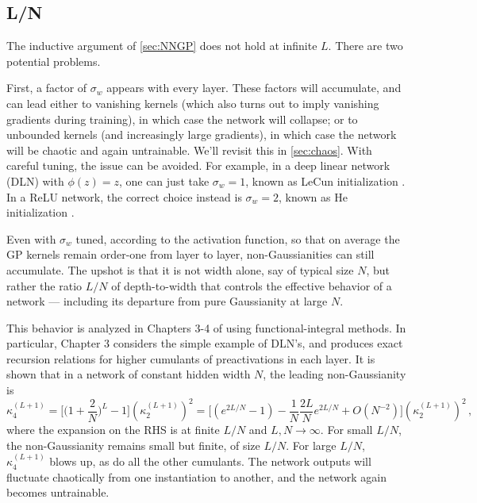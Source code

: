 \documentclass[11pt]{article}
\begin{document}
\subsection{L/N}
\label{sec:LN}

The inductive argument of \cref{sec:NNGP} does not hold at infinite $L$. There are two potential problems.

First, a factor of $\sigma_w$ appears with every layer. These factors will accumulate, and can lead either to vanishing kernels (which also turns out to imply vanishing gradients during training), in which case the network will collapse; or to unbounded kernels (and increasingly large gradients), in which case the network will be chaotic and again untrainable. We'll revisit this in \cref{sec:chaos}. With careful tuning, the issue can be avoided. For example, in a deep linear network (DLN) with $\phi(z)=z$, one can just take $\sigma_w=1$, known as LeCun initialization \cite{lecun1998efficient}. In a ReLU network, the correct choice instead is $\sigma_w=2$, known as He initialization \cite{he2015delving}.

Even with $\sigma_w$ tuned, according to the activation function, so that on average the GP kernels remain order-one from layer to layer, non-Gaussianities can still accumulate. The upshot is that it is not width alone, say of typical size $N$, but rather the ratio $L/N$ of depth-to-width that controls the effective behavior of a network --- including its departure from pure Gaussianity at large $N$.

This behavior is analyzed in Chapters 3-4 of \cite{roberts2022principles} using functional-integral methods. In particular, Chapter 3 considers the simple example of DLN's, and produces exact recursion relations for higher cumulants of preactivations in each layer. It is shown that in a network of constant hidden width $N$, the leading non-Gaussianity is
%
\begin{equation} \kappa_4^{(L+1)} = \Big[ \Big(1+\frac{2}{N}\Big)^L-1\Big](\kappa_2^{(L+1)})^2 = \Big[(e^{2L/N}-1)-\frac{1}{N}\frac{2L}{N}e^{2L/N}+O(N^{-2})\Big](\kappa_2^{(L+1)})^2\,, \end{equation}
%
where the expansion on the RHS is at finite $L/N$ and $L,N\to\infty$. For small $L/N$, the non-Gaussianity remains small but finite, of size $L/N$. For large $L/N$, $\kappa_4^{(L+1)}$ blows up, as do all the other cumulants. The network outputs will fluctuate chaotically from one instantiation to another, and the network again becomes untrainable.
\end{document}
